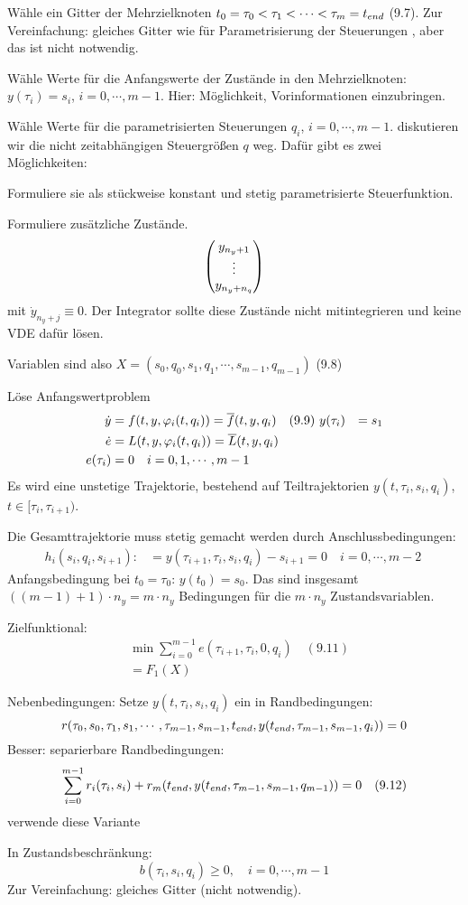 \bitm
\item Wähle ein Gitter der Mehrzielknoten $t_0 = \tau_0 < \tau_1 < \cdots < \tau_m = {t_{end}}$ (9.7). Zur Vereinfachung: gleiches Gitter wie für Parametrisierung der Steuerungen , aber das ist nicht notwendig.
\item Wähle Werte für die Anfangswerte der Zustände in den Mehrzielknoten: $y(\tau_i) = s_i$, $i=0,\cdots,m-1$. Hier: Möglichkeit, Vorinformationen einzubringen.
\item Wähle Werte für die parametrisierten Steuerungen $q_i$, $i=0,\cdots,m-1$. \obda diskutieren wir die nicht zeitabhängigen Steuergrößen $q$ weg. Dafür gibt es zwei Möglichkeiten:
\bitm
\item Formuliere sie als stückweise konstant und stetig parametrisierte Steuerfunktion.
\item Formuliere zusätzliche Zustände.
\[ \begin{pmatrix} y_{n_y +1} \\ \vdots \\ y_{n_y +n_q} \end{pmatrix} \]
mit $\dot y_{n_y +j} \equiv 0$.
\eitm
Der Integrator sollte diese Zustände nicht mitintegrieren und keine VDE dafür lösen.
\item Variablen sind also $X = (s_0, q_0, s_1, q_1, \cdots, s_{m-1}, q_{m-1})$ (9.8) 
\item Löse Anfangswertproblem
\begin{align*}
\dot y &= f(t,y,\varphi_i(t,q_i)) = \overline f(t,y,q_i) \quad (9.9) \
y(\tau_i) &= s_1 \\
\dot e &= L(t,y,\varphi_i(t,q_i)) = \overline L(t,y,q_i) \\
e(\tau_i) &= 0 \quad i = 0,1,\cdots,m-1
\end{align*}
Es wird eine unstetige Trajektorie, bestehend auf Teiltrajektorien $y(t,\tau_i, s_i, q_i)$, $t \in [\tau_i,\tau_{i+1})$.
\item Die Gesamttrajektorie muss stetig gemacht werden durch Anschlussbedingungen:
\begin{align*}
h_i(s_i,q_i,s_{i+1}) :&= y(\tau_{i+1}, \tau_i, s_i, q_i) - s_{i+1} = 0 \quad i=0,\cdots, m-2 \
\end{align*}
Anfangsbedingung bei $t_0 = \tau_0$: $y(t_0) = s_0$. Das sind insgesamt $((m-1)+1)\cdot n_y = m \cdot n_y$ Bedingungen für die $m \cdot n_y$ Zustandsvariablen.
\item Zielfunktional:
\begin{align*}
&\min \sum\limits_{i=0}^{m-1} e(\tau_{i+1}, \tau_i, 0, q_i)  \quad (9.11)\\
&= F_1(X)
\end{align*}
\item Nebenbedingungen: Setze $y(t, \tau_i, s_i, q_i)$ ein in Randbedingungen: 
\[ r(\tau_0, s_0, \tau_1, s_1, \cdots, \tau_{m-1}, s_{m-1}, {t_{end}}, y({t_{end}}, \tau_{m-1}, s_{m-1}, q_i)) = 0 \]
Besser: separierbare Randbedingungen:
\[ \sum\limits_{i=0}^{m-1} r_i(\tau_i, s_i) + r_m({t_{end}}, y({t_{end}}, \tau_{m-1}, s_{m-1}, q_{m-1})) = 0  \quad (9.12)\]
verwende diese Variante
\bitm
\item In Zustandsbeschränkung:
\[ b(\tau_i, s_i, q_i) \geq 0, \quad i=0,\cdots,m-1 \]
Zur Vereinfachung: gleiches Gitter (nicht notwendig).
\eitm
\eitm


